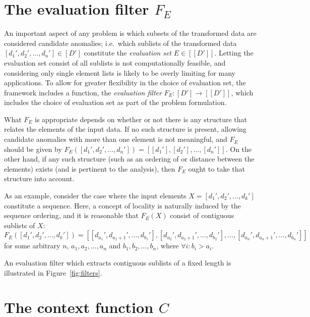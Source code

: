 \section{The evaluation filter $F_E$}

An important aspect of any problem is which subsets of the transformed data are considered candidate anomalies; i.e.\ which sublists of the transformed data $[d_1', d_2', \dots, d_n'] \in [D']$ constitute the \emph{evaluation set} $E \in [[D']]$. Letting the evaluation set consist of all sublists is not computationally feasible, and considering only single element lists is likely to be overly limiting for many applications. To allow for greater flexibility in the choice of evaluation set, the framework includes a function, the \emph{evaluation filter} $F_E: [D'] \rightarrow [[D']]$, which includes the choice of evaluation set as part of the problem formulation.

What $F_E$ is appropriate depends on whether or not there is any structure that relates the elements of the input data. If no such structure is present, allowing candidate anomalies with more than one element is not meaningful, and $F_E$ should be given by $F_E([d_1', d_2', \dots, d_n']) = [[d_1'], [d_2'], \dots, [d_n']]$. On the other hand, if any such structure (such as an ordering of or distance between the elements) exists (and is pertinent to the analysis), then $F_E$ ought to take that structure into account.

As an example, consider the case where the input elements $X = [d_1', d_2', \dots, d_k']$ constitute a sequence. Here, a concept of locality is naturally induced by the sequence ordering, and it is reasonable that $F_E(X)$ consist of contiguous sublists of $X$:
\[
    F_E([d_1', d_2', \dots, d_k']) = [[d_{a_1}', d_{a_1 + 1}', \dots, d_{b_1}'], [d_{a_2}', d_{a_2 + 1}', \dots, d_{b_2}'], \dots, [d_{a_n}', d_{a_n + 1}', \dots, d_{b_n}']]
\]
for some arbitrary $n$, $a_1, a_2, \dots, a_n$ and $b_1, b_2, \dots, b_n$, where $\forall i: b_i > a_i$.

An evaluation filter which extracts contiguous sublists of a fixed length is illustrated in Figure~\ref{fig:filters}.

\section{The context function $C$}

